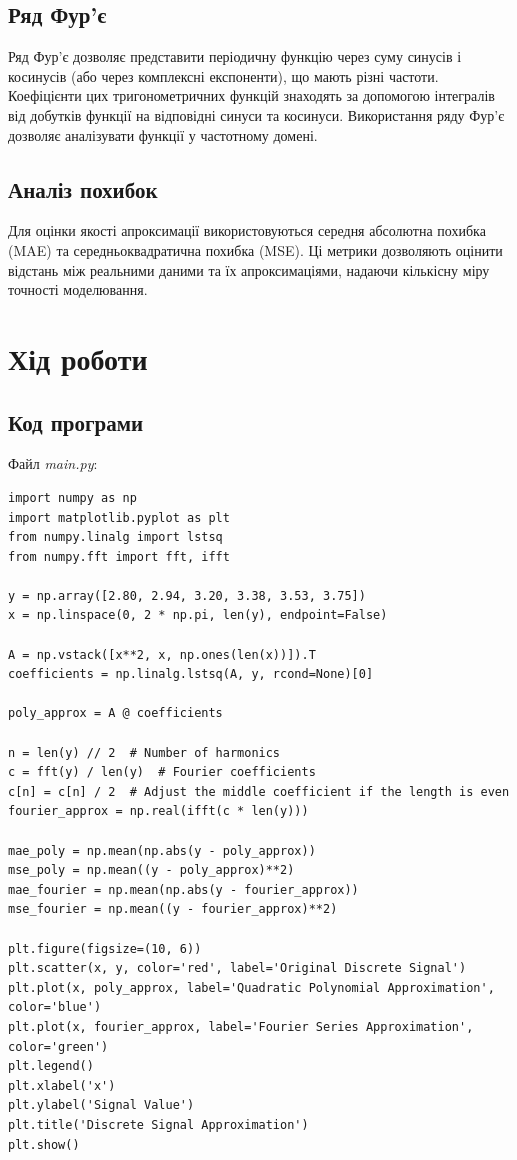 \documentclass[oneside,14pt]{extarticle}
\begin{document}
\begin{normalsize}
\subsection*{Ряд Фур'є}
Ряд Фур'є дозволяє представити періодичну функцію через суму синусів і косинусів (або через комплексні експоненти), що мають різні частоти. Коефіцієнти цих тригонометричних функцій знаходять за допомогою інтегралів від добутків функції на відповідні синуси та косинуси. Використання ряду Фур'є дозволяє аналізувати функції у частотному домені.

\subsection*{Аналіз похибок}
Для оцінки якості апроксимації використовуються середня абсолютна похибка (MAE) та середньоквадратична похибка (MSE). Ці метрики дозволяють оцінити відстань між реальними даними та їх апроксимаціями, надаючи кількісну міру точності моделювання.
	
	\section*{Хід роботи}	

	\subsection*{Код програми}
	Файл \textit{main.py}:
	{\small
		\begin{lstlisting}
import numpy as np
import matplotlib.pyplot as plt
from numpy.linalg import lstsq
from numpy.fft import fft, ifft

y = np.array([2.80, 2.94, 3.20, 3.38, 3.53, 3.75])
x = np.linspace(0, 2 * np.pi, len(y), endpoint=False)

A = np.vstack([x**2, x, np.ones(len(x))]).T
coefficients = np.linalg.lstsq(A, y, rcond=None)[0]

poly_approx = A @ coefficients

n = len(y) // 2  # Number of harmonics
c = fft(y) / len(y)  # Fourier coefficients
c[n] = c[n] / 2  # Adjust the middle coefficient if the length is even
fourier_approx = np.real(ifft(c * len(y)))

mae_poly = np.mean(np.abs(y - poly_approx))
mse_poly = np.mean((y - poly_approx)**2)
mae_fourier = np.mean(np.abs(y - fourier_approx))
mse_fourier = np.mean((y - fourier_approx)**2)

plt.figure(figsize=(10, 6))
plt.scatter(x, y, color='red', label='Original Discrete Signal')
plt.plot(x, poly_approx, label='Quadratic Polynomial Approximation', color='blue')
plt.plot(x, fourier_approx, label='Fourier Series Approximation', color='green')
plt.legend()
plt.xlabel('x')
plt.ylabel('Signal Value')
plt.title('Discrete Signal Approximation')
plt.show()


\end{lstlisting}}
\end{normalsize}
\end{document}
